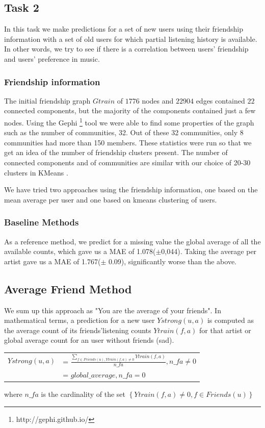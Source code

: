 \subsection{Task 2}
In this task we make predictions for a set of new users using their friendship information with a set of old users for which partial listening history is available. In other words, we try to see if there is a correlation between
users' friendship and users' preference in music.

\subsubsection{Friendship information}
The initial friendship graph $Gtrain$ of $1776$ nodes and $22904$ edges contained $22$ connected components, but the majority of the components contained just a few nodes.
Using the Gephi  \footnote{http://gephi.github.io/} tool we were able to find some properties of the graph such as the number of communities, 32.  Out of these 32 communities, only 8 communities had more than 150 members.
These statistics were run so that we get an idea of the number of friendship clusters present. The number of connected components and of communities are similar with our choice of 20-30 clusters in KMeans .

We have tried two approaches using the friendship information, one based on the mean average per user and one based on kmeans clustering of users.

\subsubsection{Baseline Methods}
As a reference method, we predict for a missing value the global average of all the available counts, which gave us a MAE of 1.078($\pm$0,044). Taking the average per artist gave us a MAE of 1.767($\pm$  0.09), significantly worse than the above.

\subsection{Average Friend Method}
We sum up this approach as "You are the average of your friends".
In mathematical terms, a prediction for a new user $Ystrong(u,a)$ is computed as the average count of its friends'listening counts $Ytrain(f,a)$ for that artist or global average count for an user without friends (sad).

\begin{table}[h]
  \centering
  \begin{tabular}{ c  l }
  $Ystrong(u,a) $&= $\frac{\sum_{f\in Friends(u), Ytrain(f,a)\neq0}{Ytrain(f,a)}}{n\_fa}, n\_fa \neq 0$ \\ 
                          &= $global\_average, n\_fa = 0$ \\ 
  \end{tabular}
\end{table}
where $n\_fa$ is the cardinality of the set $\left\{ Ytrain(f,a)\neq0, f\in Friends(u)\right\}$

